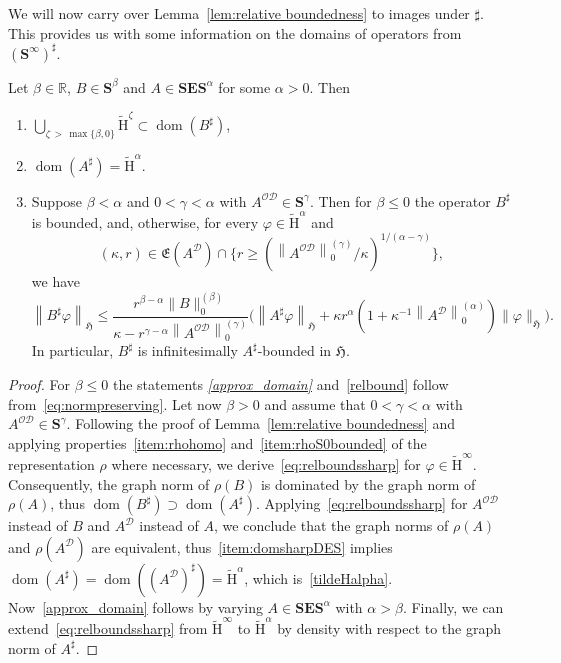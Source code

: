 \documentclass[AHL,Unicode,longabstracts,published]{cedram}
\DeclareMathOperator{\dom}{dom}
\renewcommand{\mathsf}{\mathrm}
\newcommand{\sfH}{\mathsf{H}}
\newcommand{\R}{\mathbb R}
\newcommand{\CD}{\mathcal{D}}
\newcommand{\CO}{\mathcal{O}}
\newcommand{\BE}{\mathbf E}
\newcommand{\BS}{\mathbf S}
\newcommand{\FE}{\mathfrak{E}}
\newcommand{\FH}{\mathfrak H}
\renewcommand{\phi}{\varphi}
\renewcommand{\subseteq}{\subset}
\renewcommand{\supseteq}{\supset}
\newcommand{\er}{r}
\begin{document}
We will now carry over Lemma~\ref{lem:relative boundedness} to images under $\sharp$. This provides us with some information on the domains of operators from $(\BS^\infty)^\sharp$.
\begin{lemm}\label{lem:relboundsrho}
Let $\beta\in\R$, $B\in\BS^\beta$ and $A\in\BS\BE\BS^\alpha$ for some $\alpha>0$. Then
\begin{enumerate}
\item\label{approx_domain}
$\bigcup_{\zeta\,>\,\max\{\beta, 0\}}\widetilde{\sfH}^\zeta\subseteq\dom(B^\sharp)$,
\item\label{tildeHalpha}
$\dom(A^\sharp)=\widetilde{\sfH}^\alpha$.
\item\label{relbound}
Suppose $\beta < \alpha$ and $0 <\gamma < \alpha$ with $A^{\CO\CD}\in \BS^\gamma$. Then for $\beta\le 0$ the operator $B^\sharp$ is bounded, and, otherwise, for every $\phi\in\widetilde{\sfH}^\alpha$ and
\[
(\kappa, \er)\in\FE\left(A^\CD\right)\cap \Big\{\er
\geq\left(\left\|A^{\CO\CD}\right\|_0^{(\gamma)}/\kappa\right)^{1/(\alpha
-\gamma)}\Big\},
\]
we have
\begin{equation}\label{eq:relboundssharp}
\left\|B^\sharp\phi\right\|_{\FH} \le \frac{\er^{\beta -\alpha}\|B\|_0^{(\beta)}}{\kappa -\er^{\gamma -\alpha}\left\|A^{\CO\CD}\right\|_0^{(\gamma)}}\Big(\left\|A^\sharp\phi\right\|_{\FH} +\kappa \er^{\alpha}\left(1 +\kappa^{-1}\left\|A^\CD\right\|_0^{(\alpha)}\right)\|\phi\|_{\FH}\Big).
\end{equation}
In particular, $B^\sharp$ is infinitesimally $A^\sharp$-bounded in $\FH$.
\end{enumerate}
\end{lemm}

\begin{proof}
For $\beta\le 0$ the statements \emph{\eqref{approx_domain}} and~\eqref{relbound} follow from~\eqref{eq:normpreserving}. Let now $\beta>0$ and assume that $0 <\gamma < \alpha$ with $A^{\CO\CD}\in \BS^\gamma$. Following the proof of Lemma~\ref{lem:relative boundedness} and applying properties~\eqref{item:rhohomo} and~\eqref{item:rhoS0bounded} of the representation $\rho$ where necessary, we derive~\eqref{eq:relboundssharp} for $\phi\in\widetilde{\sfH}^\infty$. Consequently, the graph norm of $\rho(B)$ is dominated by the graph norm of $\rho(A)$, thus $\dom(B^\sharp)\supseteq \dom(A^\sharp)$. Applying~\eqref{eq:relboundssharp} for $A^{\CO\CD}$ instead of $B$ and $A^{\CD}$ instead of $A$, we conclude that the graph norms of $\rho(A)$ and $\rho(A^\CD)$ are equivalent, thus~\eqref{item:domsharpDES} implies $\dom(A^\sharp)=\dom((A^\CD)^\sharp)=\widetilde{\sfH}^\alpha$, which is~\eqref{tildeHalpha}. Now~\eqref{approx_domain} follows by varying $A\in \BS\BE\BS^\alpha$ with $\alpha >\beta$. Finally, we can extend~\eqref{eq:relboundssharp} from $\widetilde{\sfH}^\infty$ to $\widetilde{\sfH}^\alpha$ by density with respect to the graph norm of $A^\sharp$.
\end{proof}
\end{document}

